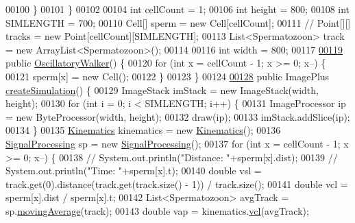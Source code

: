 \begin{DoxyCode}
00100     \}
00101   \}
00102 
00104   \textcolor{keywordtype}{int}    cellCount = 1;
00106   \textcolor{keywordtype}{int}    height    = 800;
00108   \textcolor{keywordtype}{int}    SIMLENGTH = 700;
00110   Cell[] sperm     = \textcolor{keyword}{new} Cell[cellCount];
00111   \textcolor{comment}{// Point[][] tracks = new Point[cellCount][SIMLENGTH];}
00113 \textcolor{comment}{}  List<Spermatozoon> track = \textcolor{keyword}{new} ArrayList<Spermatozoon>();
00114 
00116   \textcolor{keywordtype}{int} width = 800;
00117 
\hypertarget{_oscillatory_walker_8java_source_l00119}{}\hyperlink{classdata_1_1_oscillatory_walker_ad2f07a526bf7192224e41a93355496ee}{00119}   \textcolor{keyword}{public} \hyperlink{classdata_1_1_oscillatory_walker_ad2f07a526bf7192224e41a93355496ee}{OscillatoryWalker}() \{
00120     \textcolor{keywordflow}{for} (\textcolor{keywordtype}{int} x = cellCount - 1; x >= 0; x--) \{
00121       sperm[x] = \textcolor{keyword}{new} Cell();
00122     \}
00123   \}
00124 
\hypertarget{_oscillatory_walker_8java_source_l00128}{}\hyperlink{classdata_1_1_oscillatory_walker_ad015489397f3b1157e02d08913211ee4}{00128}   \textcolor{keyword}{public} ImagePlus \hyperlink{classdata_1_1_oscillatory_walker_ad015489397f3b1157e02d08913211ee4}{createSimulation}() \{
00129     ImageStack imStack = \textcolor{keyword}{new} ImageStack(width, height);
00130     \textcolor{keywordflow}{for} (\textcolor{keywordtype}{int} i = 0; i < SIMLENGTH; i++) \{
00131       ImageProcessor ip = \textcolor{keyword}{new} ByteProcessor(width, height);
00132       draw(ip);
00133       imStack.addSlice(ip);
00134     \}
00135     \hyperlink{classfunctions_1_1_kinematics}{Kinematics} kinematics = \textcolor{keyword}{new} \hyperlink{classfunctions_1_1_kinematics}{Kinematics}();
00136     \hyperlink{classfunctions_1_1_signal_processing}{SignalProcessing} sp = \textcolor{keyword}{new} \hyperlink{classfunctions_1_1_signal_processing}{SignalProcessing}();
00137     \textcolor{keywordflow}{for} (\textcolor{keywordtype}{int} x = cellCount - 1; x >= 0; x--) \{
00138       \textcolor{comment}{// System.out.println("Distance: "+sperm[x].dist);}
00139       \textcolor{comment}{// System.out.println("Time: "+sperm[x].t);}
00140       \textcolor{keywordtype}{double} vsl = track.get(0).distance(track.get(track.size() - 1)) / track.size();
00141       \textcolor{keywordtype}{double} vcl = sperm[x].dist / sperm[x].t;
00142       List<Spermatozoon> avgTrack = sp.\hyperlink{classfunctions_1_1_signal_processing_a4f10245c50d850b87d1ef4d81c28300d}{movingAverage}(track);
00143       \textcolor{keywordtype}{double} vap = kinematics.\hyperlink{classfunctions_1_1_kinematics_af6e1e75567a927a9c627616cb68b0d7f}{vcl}(avgTrack);

\end{DoxyCode}
